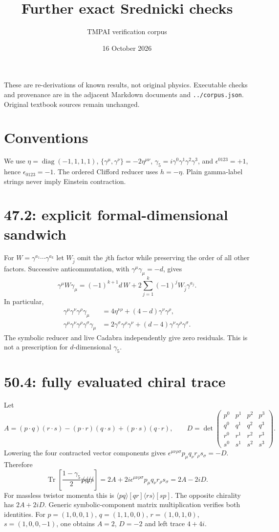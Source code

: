 \documentclass{article}
\begin{document}
\title{Further exact Srednicki checks}
\author{TMPAI verification corpus}
\date{16 October 2026}
\maketitle
These are re-derivations of known results, not original physics.
Executable checks and provenance are in the adjacent Markdown documents
and \texttt{../corpus.json}. Original textbook sources remain unchanged.

\section*{Conventions}
We use $\eta=\operatorname{diag}(-1,1,1,1)$,
$\{\gamma^\mu,\gamma^\nu\}=-2\eta^{\mu\nu}$,
$\gamma_5=i\gamma^0\gamma^1\gamma^2\gamma^3$, and
$\epsilon^{0123}=+1$, hence $\epsilon_{0123}=-1$.
The ordered Clifford reducer uses $h=-\eta$.
Plain gamma-label strings never imply Einstein contraction.

\section*{47.2: explicit formal-dimensional sandwich}
For $W=\gamma^{a_1}\cdots\gamma^{a_k}$ let $W_{\widehat j}$ omit
the $j$th factor while preserving the order of all other factors.
Successive anticommutation, with $\gamma^\mu\gamma_\mu=-d$, gives
\[
 \gamma^\mu W\gamma_\mu
 =(-1)^{k+1}d\,W+
  2\sum_{j=1}^k(-1)^j W_{\widehat j}\gamma^{a_j}.
\]
In particular,
\begin{align*}
\gamma^\mu\gamma^\nu\gamma^\rho\gamma_\mu
 &=4\eta^{\nu\rho}+(4-d)\gamma^\nu\gamma^\rho,\\
\gamma^\mu\gamma^\nu\gamma^\rho\gamma^\sigma\gamma_\mu
 &=2\gamma^\sigma\gamma^\rho\gamma^\nu
   +(d-4)\gamma^\nu\gamma^\rho\gamma^\sigma .
\end{align*}
The symbolic reducer and live Cadabra independently give zero residuals.
This is not a prescription for $d$-dimensional $\gamma_5$.

\section*{50.4: fully evaluated chiral trace}
Let
\[
 A=(p\cdot q)(r\cdot s)-(p\cdot r)(q\cdot s)
      +(p\cdot s)(q\cdot r),\qquad
 D=\det\begin{pmatrix}p^0&p^1&p^2&p^3\\q^0&q^1&q^2&q^3\\
 r^0&r^1&r^2&r^3\\s^0&s^1&s^2&s^3\end{pmatrix}.
\]
Lowering the four contracted vector components gives
$\epsilon^{\mu\nu\rho\sigma}p_\mu q_\nu r_\rho s_\sigma=-D$.
Therefore
\[
 \operatorname{Tr}\left[
 \frac{1-\gamma_5}{2}\not p\not q\not r\not s\right]
 =2A+2i\epsilon^{\mu\nu\rho\sigma}p_\mu q_\nu r_\rho s_\sigma
 =2A-2iD.
\]
For massless twistor momenta this is
$\langle pq\rangle[qr]\langle rs\rangle[sp]$.
The opposite chirality has $2A+2iD$.
Generic symbolic-component matrix multiplication verifies both identities.
For $p=(1,0,0,1)$, $q=(1,1,0,0)$, $r=(1,0,1,0)$,
$s=(1,0,0,-1)$, one obtains $A=2$, $D=-2$ and left trace $4+4i$.
\end{document}
